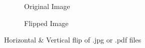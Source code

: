 \documentclass{article}
\begin{document}
\begin{figure}
    \begin{subfigure}[b]{.5\textwidth}
       \caption{Original Image}
     \end{subfigure}
     \begin{subfigure}[b]{.5\textwidth}
     \caption{Flipped Image}
   \end{subfigure}
 \caption{Horizontal \& Vertical flip of .jpg or .pdf files}
 \end{figure}
 
\end{document}
